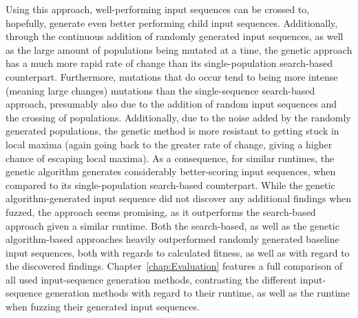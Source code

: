 \vspace*{2mm}
Using this approach, well-performing input sequences can be crossed to, hopefully, generate even better performing child input sequences. Additionally, through the continuous addition of randomly generated input sequences, as well as the large amount of populations being mutated at a time, the genetic approach has a much more rapid rate of change than its single-population search-based counterpart. Furthermore, mutations that do occur tend to being more intense (meaning large changes) mutations than the single-sequence search-based approach, presumably also due to the addition of random input sequences and the crossing of populations. Additionally, due to the noise added by the randomly generated populations, the genetic method is more resistant to getting stuck in local maxima (again going back to the greater rate of change, giving a higher chance of escaping local maxima). As a consequence, for similar runtimes, the genetic algorithm generates considerably better-scoring input sequences, when compared to its single-population search-based counterpart. While the genetic algorithm-generated input sequence did not discover any additional findings when fuzzed, the approach seems promising, as it outperforms the search-based approach given a similar runtime. Both the search-based, as well as the genetic algorithm-based approaches heavily outperformed randomly generated baseline input sequences, both with regards to calculated fitness, as well as with regard to the discovered findings. Chapter~\ref{chap:Evaluation} features a full comparison of all used input-sequence generation methods, contrasting the different input-sequence generation methods with regard to their runtime, as well as the runtime when fuzzing their generated input sequences.